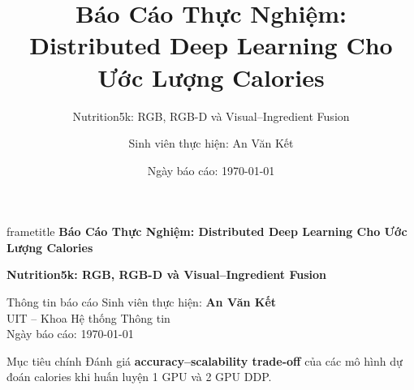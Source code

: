 \documentclass[10pt,aspectratio=169]{beamer}
\title[Distributed DL cho Calories]{Báo Cáo Thực Nghiệm: Distributed Deep Learning Cho Ước Lượng Calories}
\subtitle{Nutrition5k: RGB, RGB-D và Visual--Ingredient Fusion}
\author{Sinh viên thực hiện: An Văn Kết}
\date{Ngày báo cáo: \today}
\newcommand{\kw}[1]{\textcolor{uitblue}{\bfseries #1}}
\begin{document}
{
\usebackgroundtemplate{}
\begin{frame}[plain]
\vspace{0.25cm}
\begin{center}
\begin{beamercolorbox}[wd=0.94\paperwidth,ht=1.25cm,dp=0.28cm,center,rounded=true]{frametitle}
{\Large\bfseries Báo Cáo Thực Nghiệm: Distributed Deep Learning Cho Ước Lượng Calories}
\end{beamercolorbox}

\vspace{0.25cm}
{\large\color{accent}\bfseries Nutrition5k: RGB, RGB-D và Visual--Ingredient Fusion}

\vspace{0.55cm}
\begin{uitbox}[width=0.78\paperwidth]{Thông tin báo cáo}
\centering
\faUser\quad Sinh viên thực hiện: \textbf{An Văn Kết}\\[3pt]
\faUniversity\quad UIT -- Khoa Hệ thống Thông tin\\[3pt]
\faCalendar\quad Ngày báo cáo: \today
\end{uitbox}

\vspace{0.35cm}
\begin{accentbox}[width=0.78\paperwidth]{Mục tiêu chính}
\centering
Đánh giá \kw{accuracy--scalability trade-off} của các mô hình dự đoán calories khi huấn luyện 1 GPU và 2 GPU DDP.
\end{accentbox}
\end{center}
\end{frame}
}
\end{document}
